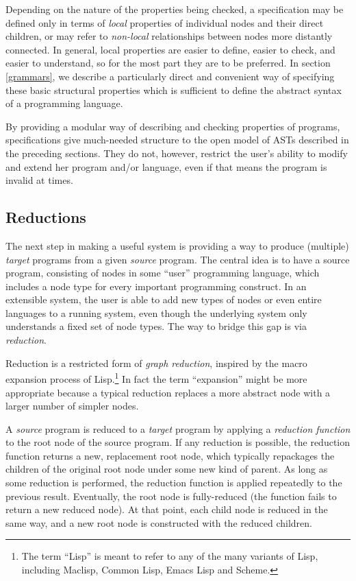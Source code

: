 Depending on the nature of the properties being checked, a specification may be defined only in terms of \emph{local} properties of individual nodes and their direct children, or may refer to \emph{non-local} relationships between nodes more distantly connected. In general, local properties are easier to define, easier to check, and easier to understand, so for the most part they are to be preferred. In section \ref{grammars}, we describe a particularly direct and convenient way of specifying these basic structural properties which is sufficient to define the abstract syntax of a programming language.

By providing a modular way of describing and checking properties of programs, specifications give much-needed structure to the open model of ASTs described in the preceding sections. They do not, however, restrict the user's ability to modify and extend her program and/or language, even if that means the program is invalid at times.


\subsection{Reductions}
\label{reduction}
The next step in making a useful system is providing a way to produce (multiple) \emph{target} programs from a given \emph{source} program. The central idea is to have a source program, consisting of nodes in some ``user'' programming language, which includes a node type for every important programming construct. In an extensible system, the user is able to add new types of nodes or even entire languages to a running system, even though the underlying system only understands a fixed set of node types. The way to bridge this gap is via \emph{reduction}.

Reduction is a restricted form of \emph{graph reduction}, inspired by the macro expansion process of Lisp.\footnote{The term ``Lisp'' is meant to refer to any of the many variants of Lisp, including Maclisp, Common Lisp, Emacs Lisp and Scheme.} In fact the term ``expansion'' might be more appropriate because a typical reduction replaces a more abstract node with a larger number of simpler nodes.

A \emph{source} program is reduced to a \emph{target} program by applying a \emph{reduction function} to the root node of the source program. If any reduction is possible, the reduction function returns a new, replacement root node, which typically repackages the children of the original root node under some new kind of parent. As long as some reduction is performed, the reduction function is applied repeatedly to the previous result. Eventually, the root node is fully-reduced (the function fails to return a new reduced node). At that point, each child node is reduced in the same way, and a new root node is constructed with the reduced children.

